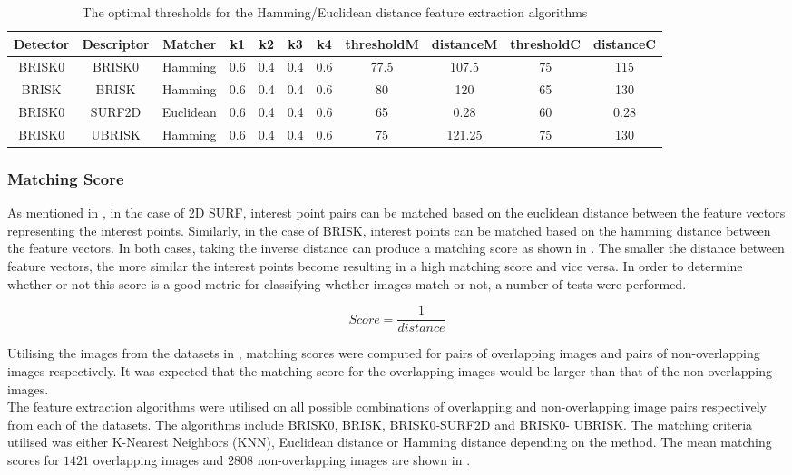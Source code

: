 \documentclass{article}
\begin{document}
\begin{table}
\caption{The optimal thresholds for the Hamming/Euclidean distance feature extraction algorithms}
\begin{tabular}{|c|c|c|c|c|c|c|c|c|c|c|}
\hline 
Detector & Descriptor & Matcher & k1 & k2 & k3 & k4 & thresholdM & distanceM & thresholdC & distanceC\tabularnewline
\hline 
\hline 
BRISK0 & BRISK0 & Hamming & 0.6 & 0.4 & 0.4 & 0.6 & 77.5 & 107.5 & 75 & 115\tabularnewline
\hline 
BRISK & BRISK & Hamming & 0.6 & 0.4 & 0.4 & 0.6 & 80 & 120 & 65 & 130\tabularnewline
\hline 
BRISK0 & SURF2D & Euclidean & 0.6 & 0.4 & 0.4 & 0.6 & 65 & 0.28 & 60 & 0.28\tabularnewline
\hline 
BRISK0 & UBRISK & Hamming & 0.6 & 0.4 & 0.4 & 0.6 & 75 & 121.25 & 75 & 130\tabularnewline
\hline 
\end{tabular}
\label{tab:hammingStatistics}
\end{table}

\subsubsection{Matching Score}
\label{sec:matchingScore}
As mentioned in , in the case of 2D SURF, interest point pairs can be matched based on the euclidean distance between the feature vectors representing the interest points. Similarly, in the case of BRISK, interest points can be matched based on the hamming distance between the feature vectors. In both cases, taking the inverse distance can produce a matching score as shown in . The smaller the distance between feature vectors, the more similar the interest points become resulting in a high matching score and vice versa. In order to determine whether or not this score is a good metric for classifying whether images match or not, a number of tests were performed.

\begin{equation}
Score = \frac{1}{distance}
\label{eqn:inverseDistance}
\end{equation}

Utilising the images from the datasets in , matching scores were computed for pairs of overlapping images and pairs of non-overlapping images respectively. It was expected that the matching score for the overlapping images would be larger than that of the non-overlapping images. \\

The feature extraction algorithms were utilised on all possible combinations of overlapping and non-overlapping image pairs respectively from each of the datasets. The algorithms include BRISK0, BRISK, BRISK0-SURF2D and BRISK0- UBRISK. The matching criteria utilised was either K-Nearest Neighbors (KNN), Euclidean distance or Hamming distance depending on the method. The mean matching scores for $1421$ overlapping images and $2808$ non-overlapping images are shown in . \\
\end{document}
